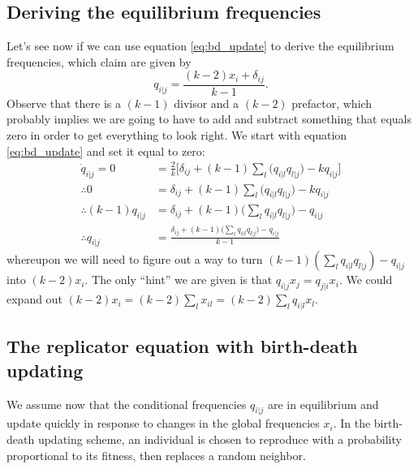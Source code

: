 \documentclass[14pt, justified]{tufte-book}
\begin{document}
\subsection{Deriving the equilibrium frequencies}

Let's see now if we can use equation \ref{eq:bd_update} to derive the equilibrium frequencies, which \citet{ohtsuki.nowak_2006} claim are given by
\begin{equation}
    q_{i|j} = \frac{(k-2)x_i + \delta_{ij}}{k-1}.
\end{equation}
Observe that there is a $(k-1)$ divisor and a $(k-2)$ prefactor, which probably implies we are going to have to add and subtract something that equals zero in order to get everything to look right.
We start with equation \ref{eq:bd_update} and set it equal to zero:
\begin{equation}
    \begin{split}
        \dot{q}_{i|j} = 0 & = \frac{2}{k} \Big[ \delta_{ij} + (k-1)\sum_l \Big( q_{i|l}q_{l|j} \Big) - kq_{i|j} \Big]
        \\
        \therefore 0 & = \delta_{ij} + (k-1)\sum_l \Big( q_{i|l}q_{l|j} \Big) - kq_{i|j}
        \\
        \therefore (k-1)q_{i|j} & = \delta_{ij} + (k-1)\Big( \sum_l q_{i|l}q_{l|j} \Big) - q_{i|j}
        \\
        \therefore q_{i|j} & = \frac{\delta_{ij} + (k-1)\Big( \sum_l q_{i|l}q_{l|j} \Big) - q_{i|j}}{k-1}
    \end{split}
\end{equation}
whereupon we will need to figure out a way to turn $(k-1)(\sum_l q_{i|l}q_{l|j}) - q_{i|j}$ into $(k-2)x_i$.
The only ``hint'' we are given is that $q_{i|j}x_j = q_{j|i}x_i$.
We could expand out $(k-2)x_i = (k-2)\sum_l x_{il} = (k-2)\sum_l q_{i|l} x_l$.

\subsection{The replicator equation with birth-death updating}

We assume now that the conditional frequencies $q_{i|j}$ are in equilibrium and update quickly in response to changes in the global frequencies $x_i$.
In the birth-death updating scheme, an individual is chosen to reproduce with a probability proportional to its fitness, then replaces a random neighbor.
\end{document}
